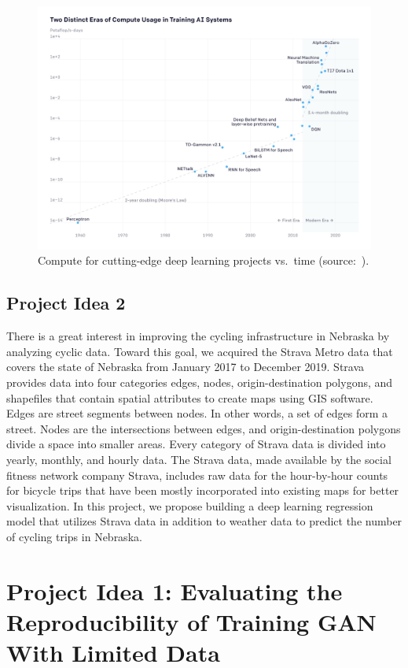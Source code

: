 \documentclass{report}
\begin{document}
\begin{figure}
    \centering
    \includegraphics[width=\textwidth]{figs/ai-and-compute-all-2.png}
    \caption{Compute for cutting-edge deep learning projects vs.\ time (source:~\cite{AI-compute18}).}
    \label{fig:compute}
\end{figure}

\subsection{Project Idea 2}
There is a great interest in improving the cycling infrastructure in Nebraska by analyzing cyclic data. Toward this goal, we acquired the Strava Metro data that covers the state of Nebraska from January 2017 to December 2019.  Strava provides data into four categories edges, nodes, origin-destination polygons, and shapefiles that contain spatial attributes to create maps using GIS software. Edges are street segments between nodes. In other words, a set of edges form a street. Nodes are the intersections between edges, and origin-destination polygons divide a space into smaller areas. Every category of Strava data is divided into yearly, monthly, and hourly data. The Strava data, made available by the social fitness network company Strava, includes raw data for the hour-by-hour counts for bicycle trips that have been mostly incorporated into existing maps for better visualization. In this project, we propose building a deep learning regression model that utilizes Strava data in addition to weather data to predict the number of cycling trips in Nebraska. 


\section{Project Idea 1: Evaluating the Reproducibility of Training GAN With Limited Data}
\end{document}
